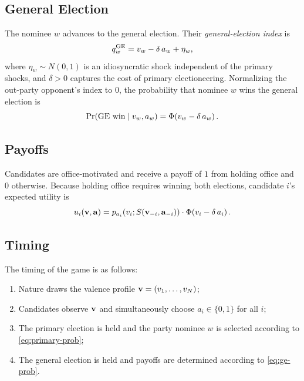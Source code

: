 \documentclass[12pt]{article}
\begin{document}
\subsection*{General Election}

The nominee $w$ advances to the general election.
Their \emph{general-election index} is
\begin{equation}
    q_w^{\text{GE}} = v_w - \delta\, a_w + \eta_w,
    \label{eq:ge-index}
\end{equation}
where $\eta_w \sim N(0,1)$ is an idiosyncratic shock independent of the primary shocks,
and $\delta > 0$ captures the cost of primary electioneering.
Normalizing the out-party opponent's index to $0$, the probability that nominee $w$ wins the general election is
\begin{equation}
    \Pr(\text{GE}\text{ win} \mid v_w, a_w) = \Phi\!\left(v_w-\delta\,a_w\right).
    \label{eq:ge-prob}
\end{equation}

\subsection*{Payoffs}

Candidates are office-motivated and receive a payoff of $1$ from holding office and $0$ otherwise.
Because holding office requires winning both elections, candidate $i$'s expected utility is
\begin{equation}
    u_i(\mathbf v, \mathbf a)
        = p_{a_i}\!\left(v_i;S\!\left(\mathbf v_{-i},\mathbf a_{-i}\right)\right) \cdot \Phi\!\left(v_i-\delta\,a_i\right).
    \label{eq:utility}
\end{equation}

\subsection*{Timing}

The timing of the game is as follows:
\begin{enumerate}
    \item Nature draws the valence profile $\mathbf v = (v_1,\dots,v_N)$;
    \item Candidates observe $\mathbf v$ and simultaneously choose $a_i \in \{0,1\}$ for all $i$;
    \item The primary election is held and the party nominee $w$ is selected according to \eqref{eq:primary-prob};
    \item The general election is held and payoffs are determined according to \eqref{eq:ge-prob}.
\end{enumerate}
\end{document}
